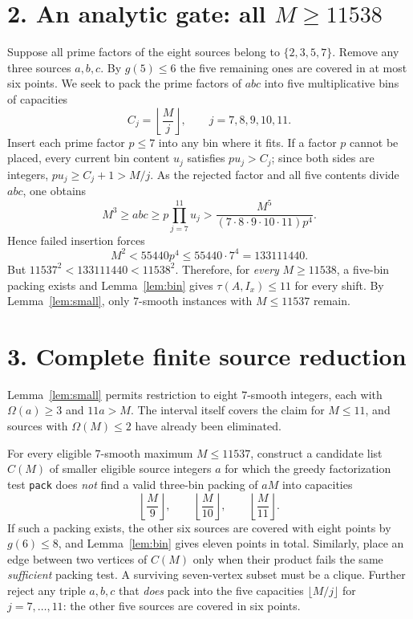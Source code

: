 \documentclass[11pt,a4paper]{article}
\newcommand{\om}{\Omega}
\begin{document}
\section*{2. An analytic gate: all $M\ge11538$}
Suppose all prime factors of the eight sources belong to $\{2,3,5,7\}$. Remove any three sources $a,b,c$. By $g(5)\le6$ the five remaining ones are covered in at most six points. We seek to pack the prime factors of $abc$ into five multiplicative bins of capacities
\[
 C_j=\left\lfloor\frac Mj\right\rfloor,\qquad j=7,8,9,10,11.
\]
Insert each prime factor $p\le7$ into any bin where it fits. If a factor $p$ cannot be placed, every current bin content $u_j$ satisfies $p u_j>C_j$; since both sides are integers, $pu_j\ge C_j+1>M/j$. As the rejected factor and all five contents divide $abc$, one obtains
\[
 M^3\ge abc\ge p\prod_{j=7}^{11}u_j
 >\frac{M^5}{(7\cdot8\cdot9\cdot10\cdot11)p^4}.
\]
Hence failed insertion forces
\[
 M^2< 55440p^4\le55440\cdot7^4=133111440.
\]
But $11537^2<133111440<11538^2$. Therefore, for \emph{every} $M\ge11538$, a five-bin packing exists and Lemma~\ref{lem:bin} gives $\tau(A,I_x)\le11$ for every shift. By Lemma~\ref{lem:small}, only $7$-smooth instances with $M\le11537$ remain.

\section*{3. Complete finite source reduction}
Lemma~\ref{lem:small} permits restriction to eight $7$-smooth integers, each with $\om(a)\ge3$ and $11a>M$. The interval itself covers the claim for $M\le11$, and sources with $\om(M)\le2$ have already been eliminated.

For every eligible $7$-smooth maximum $M\le11537$, construct a candidate list $C(M)$ of smaller eligible source integers $a$ for which the greedy factorization test \texttt{pack} does \emph{not} find a valid three-bin packing of $aM$ into capacities
\[
 \left\lfloor\frac M9\right\rfloor,\qquad
 \left\lfloor\frac M{10}\right\rfloor,\qquad
 \left\lfloor\frac M{11}\right\rfloor.
\]
If such a packing exists, the other six sources are covered with eight points by $g(6)\le8$, and Lemma~\ref{lem:bin} gives eleven points in total. Similarly, place an edge between two vertices of $C(M)$ only when their product fails the same \emph{sufficient} packing test. A surviving seven-vertex subset must be a clique. Further reject any triple $a,b,c$ that \emph{does} pack into the five capacities $\lfloor M/j\rfloor$ for $j=7,\dots,11$: the other five sources are covered in six points.
\end{document}
